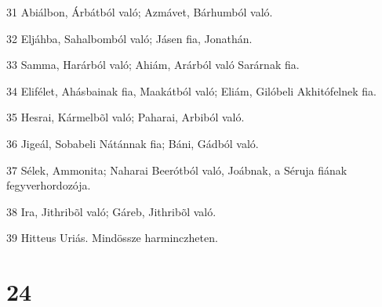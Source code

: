 \par 31 Abiálbon, Árbátból való; Azmávet, Bárhumból való.
\par 32 Eljáhba, Sahalbomból való; Jásen fia, Jonathán.
\par 33 Samma, Harárból való; Ahiám, Arárból való Sarárnak fia.
\par 34 Elifélet, Ahásbainak fia, Maakátból való; Eliám, Gilóbeli  Akhitófelnek fia.
\par 35 Hesrai, Kármelbõl való; Paharai, Arbiból való.
\par 36 Jigeál, Sobabeli Nátánnak fia; Báni, Gádból való.
\par 37 Sélek, Ammonita; Naharai Beerótból való, Joábnak, a Séruja fiának fegyverhordozója.
\par 38 Ira, Jithribõl való; Gáreb, Jithribõl való.
\par 39 Hitteus Uriás. Mindössze harminczheten.

\chapter{24}

